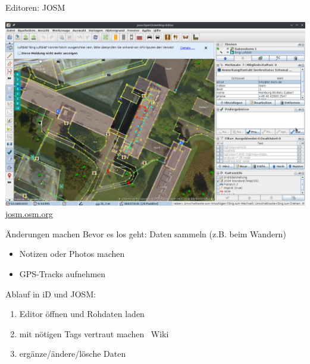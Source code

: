 \documentclass{beamer}
\begin{document}
			\begin{frame}{Editoren: JOSM}
				\begin{center}
					\includegraphics[height=0.75\textheight]{images/josm-editor.jpg}
					\href{https://josm.openstreetmap.de/}{josm.osm.org}
				\end{center}
			\end{frame}
			
			\begin{frame}{Änderungen machen}
				Bevor es los geht: Daten sammeln (z.B. beim Wandern)
				\begin{itemize}
					\item Notizen oder Photos machen
					\item GPS-Tracks aufnehmen
				\end{itemize}
				\pause
				\vspace{0.25cm}
				Ablauf in iD und JOSM:
				\begin{enumerate}
					\item Editor öffnen und Rohdaten laden\pause
					\item mit nötigen Tags vertraut machen \textrightarrow\ Wiki\pause
					\item ergänze/ändere/lösche Daten
				\end{enumerate}
			\end{frame}
			
\end{document}
